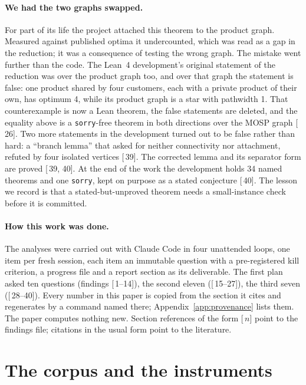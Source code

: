 \documentclass[11pt,a4paper]{article}
\renewcommand{\S}[1]{[\textsection\,#1]}
\newcommand{\code}[1]{\texttt{#1}}
\begin{document}
\paragraph{We had the two graphs swapped.}
For part of its life the project attached this theorem to the product graph.
Measured against published optima it undercounted, which was read as a gap in
the reduction; it was a consequence of testing the wrong graph. The mistake
went further than the code. The Lean~4 development's original statement of
the reduction was over the product graph too, and over that graph the
statement is false: one product shared by four customers, each with a private
product of their own, has optimum 4, while its product graph is a star with
pathwidth 1. That counterexample is now a Lean theorem, the false statements
are deleted, and the equality above is a \code{sorry}-free theorem in both
directions over the MOSP graph \S{26}. Two more statements in the development
turned out to be false rather than hard: a ``branch lemma'' that asked for
neither connectivity nor attachment, refuted by four isolated vertices
\S{39}. The corrected lemma and its separator form are proved \S{39, 40}. At
the end of the work the development holds 34 named theorems and one
\code{sorry}, kept on purpose as a stated conjecture \S{40}. The lesson we
record is that a stated-but-unproved theorem needs a small-instance check
before it is committed.

\paragraph{How this work was done.}
The analyses were carried out with Claude Code in four unattended loops, one
item per fresh session, each item an immutable question with a pre-registered
kill criterion, a progress file and a report section as its deliverable. The
first plan asked ten questions (findings \S{1--14}), the second eleven
(\S{15--27}), the third seven (\S{28--40}). Every number in this paper is
copied from the section it cites and regenerates by a command named there;
Appendix~\ref{app:provenance} lists them. The paper computes nothing new.
Section references of the form \S{$n$} point to the findings file; citations
in the usual form point to the literature.

\section{The corpus and the instruments}
\label{sec:corpus}
\end{document}
